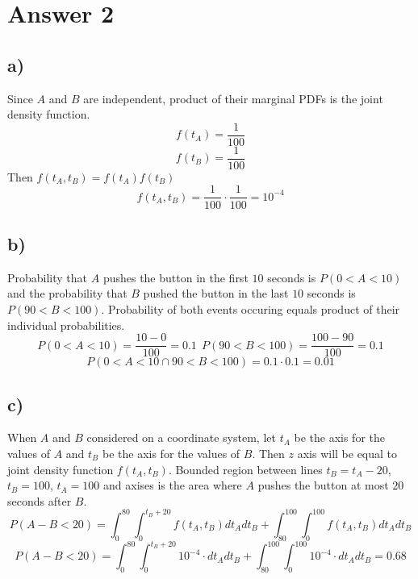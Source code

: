 \documentclass[12pt]{article}
\begin{document}
\section*{Answer 2}
\subsection*{a)}
Since $A$ and $B$ are independent, product of their marginal PDFs is the joint density function.
	\begin{equation*}
		f(t_A) = \frac{1}{100}
	\end{equation*}
	\begin{equation*}
		f(t_B) = \frac{1}{100}
	\end{equation*}
	Then $f(t_A, t_B) = f(t_A)f(t_B)$
	\begin{equation*}
		f(t_A, t_B) = \frac{1}{100} \cdot \frac{1}{100} = 10^{-4}
	\end{equation*}
\subsection*{b)}
Probability that $A$ pushes the button in the first $10$ seconds is $P(0 < A < 10)$ and the probability that $B$ pushed the button in the last $10$ seconds is $P(90 < B < 100)$. Probability of both events occuring equals product of their individual probabilities.
	\begin{equation*}
		P(0 < A < 10) = \frac{10-0}{100} = 0.1 \ \ P(90 < B < 100) = \frac{100-90}{100} = 0.1
	\end{equation*}
	\begin{equation*}
		P(0 < A < 10 \cap 90 < B < 100) = 0.1 \cdot 0.1 = 0.01
	\end{equation*}
\subsection*{c)}
When $A$ and $B$ considered on a coordinate system, let $t_A$ be the axis for the values of $A$ and $t_B$ be the axis for the values of $B$. Then $z$ axis will be equal to joint density function $f(t_A, t_B)$. Bounded region between lines $t_B = t_A - 20$, $t_B = 100$, $t_A = 100$ and axises is the area where $A$ pushes the button at most $20$ seconds after $B$.
	\begin{equation*}
		P(A-B < 20)=\int_{0}^{80} \int_{0}^{t_B+20} f(t_A, t_B) dt_Adt_B + \int_{80}^{100} \int_{0}^{100} f(t_A, t_B) dt_Adt_B
	\end{equation*}
	\begin{equation*}
		P(A-B < 20)=\int_{0}^{80} \int_{0}^{t_B+20} 10^{-4}\cdot dt_Adt_B + \int_{80}^{100} \int_{0}^{100} 10^{-4}\cdot dt_Adt_B = 0.68
	\end{equation*}
\end{document}
